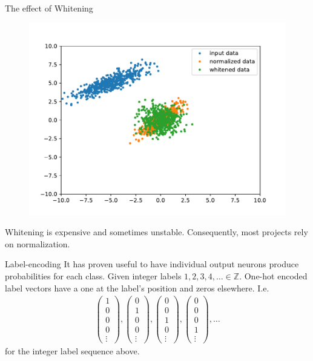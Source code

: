 \documentclass{beamer}
\begin{document}
    \begin{frame}{The effect of Whitening}
    \begin{figure}
    \includegraphics[width=\linewidth]{./figures/whitened.pdf}
      \end{figure}
      Whitening is expensive and sometimes unstable. Consequently, most projects rely on normalization.
    \end{frame}


    \begin{frame}{Label-encoding}
      It has proven useful to have individual output neurons produce probabilities for each class.
      Given integer labels $1,2,3,4, \dots \in \mathbb{Z}$. One-hot encoded label vectors have a one 
      at the label's position and zeros elsewhere. I.e.
      \begin{align}
        \begin{pmatrix}
          1 \\ 0 \\ 0 \\ 0 \\ \vdots
        \end{pmatrix},
        \begin{pmatrix}
          0 \\ 1 \\ 0 \\ 0 \\\vdots
        \end{pmatrix},
        \begin{pmatrix}
          0 \\ 0 \\ 1 \\ 0 \\\vdots
        \end{pmatrix},
        \begin{pmatrix}
          0 \\ 0 \\ 0 \\ 1 \\\vdots
        \end{pmatrix},
        \dots
      \end{align}
      for the integer label sequence above.
    \end{frame}
\end{document}
